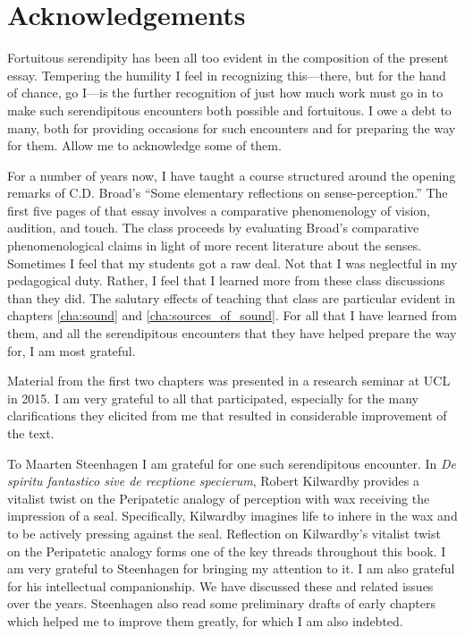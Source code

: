 \chapter*{Acknowledgements} %
\label{cha:acknowledgements}

Fortuitous serendipity has been all too evident in the composition of the present essay. Tempering the humility I feel in recognizing this---there, but for the hand of chance, go I---is the further recognition of just how much work must go in to make such serendipitous encounters both possible and fortuitous. I owe a debt to many, both for providing occasions for such encounters and for preparing the way for them. Allow me to acknowledge some of them.

For a number of years now, I have taught a course structured around the opening remarks of C.D. Broad's \citeyearpar{Broad:1952kx} ``Some elementary reflections on sense-per\-cep\-tion.'' The first five pages of that essay involves a comparative phenomenology of vision, audition, and touch. The class proceeds by evaluating Broad's comparative phenomenological claims in light of more recent literature about the senses. Sometimes I feel that my students got a raw deal. Not that I was neglectful in my pedagogical duty. Rather, I feel that I learned more from these class discussions than they did. The salutary effects of teaching that class are particular evident in chapters \ref{cha:sound} and \ref{cha:sources_of_sound}. For all that I have learned from them, and all the serendipitous encounters that they have helped prepare the way for, I am most grateful.

Material from the first two chapters was presented in a research seminar at UCL in 2015. I am very grateful to all that participated, especially for the many clarifications they elicited from me that resulted in considerable improvement of the text.

To Maarten Steenhagen I am grateful for one such serendipitous encounter. In \emph{De spiritu fantastico sive de recptione specierum}, Robert Kilwardby provides a vitalist twist on the Peripatetic analogy of perception with wax receiving the impression of a seal. Specifically, Kilwardby imagines life to inhere in the wax and to be actively pressing against the seal. Reflection on Kilwardby's vitalist twist on the Peripatetic analogy forms one of the key threads throughout this book. I am very grateful to Steenhagen for bringing my attention to it. I am also grateful for his intellectual companionship. We have discussed these and related issues over the years. Steenhagen also read some preliminary drafts of early chapters which helped me to improve them greatly, for which I am also indebted.


